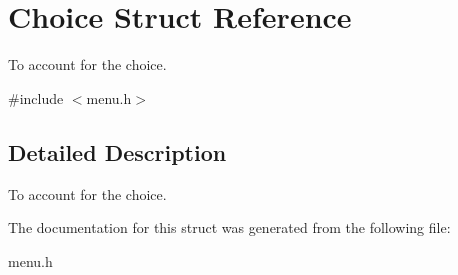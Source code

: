 \hypertarget{structChoice}{}\section{Choice Struct Reference}
\label{structChoice}


To account for the choice.  




{\ttfamily \#include $<$menu.\+h$>$}



\subsection{Detailed Description}
To account for the choice. 

The documentation for this struct was generated from the following file\+:\begin{DoxyCompactItemize}
\item 
menu.\+h\end{DoxyCompactItemize}

